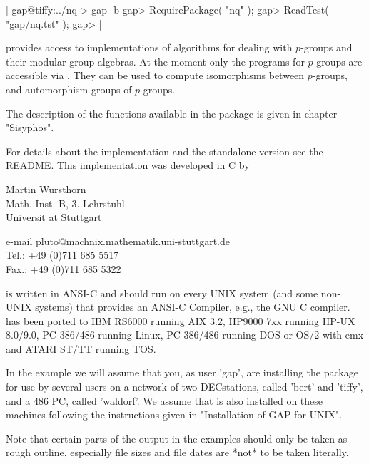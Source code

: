 |    gap@tiffy:../nq > gap -b
    gap> RequirePackage( "nq" );
    gap> ReadTest( "gap/nq.tst" );
    gap> |


{\SISYPHOS} provides  access  to  implementations   of  algorithms for
dealing with $p$-groups and their modular group algebras.  At the moment
only the programs for $p$-groups are accessible via {\GAP}.
They can be used to compute isomorphisms between $p$-groups, and
automorphism groups of $p$-groups.

The description of the functions available in the  {\SISYPHOS} package is
given in chapter "Sisyphos".


For  details about  the implementation and the standalone version see the
README. This implementation was developed in C by

Martin Wursthorn\\
Math. Inst. B, 3. Lehrstuhl\\
Universit{ a}t Stuttgart

e-mail pluto@machnix.mathematik.uni-stuttgart.de\\
Tel.: +49 (0)711 685 5517\\
Fax.: +49 (0)711 685 5322


{\SISYPHOS} is written in ANSI-C and should run on every UNIX system
(and some non-UNIX systems) that provides an ANSI-C Compiler, e.g., the
GNU C compiler.  {\SISYPHOS} has been ported to IBM RS6000 running
AIX 3.2, HP9000 7xx running HP-UX 8.0/9.0, PC 386/486 running Linux,
PC 386/486 running DOS or OS/2 with emx
and ATARI ST/TT running TOS.

In the example we will assume that you, as user 'gap', are installing the
{\SISYPHOS}  package  for  use  by several  users  on  a  network  of two
DECstations, called  'bert' and 'tiffy', and  a 486 PC, called 'waldorf'.
We assume that {\GAP}  is also installed  on these machines following the
instructions given in "Installation of GAP for UNIX".

Note that certain parts  of  the  output  in the examples should  only be
taken as rough outline, especially file sizes and file dates are *not* to
be taken literally.

